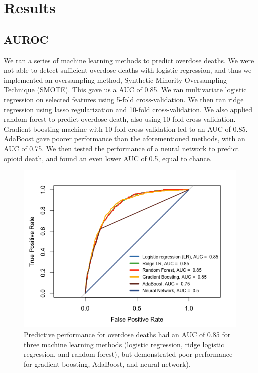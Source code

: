 \documentclass[twoside,10.5pt]{article}
\begin{document}
\section{Results}

\subsection{AUROC}
We ran a series of machine learning methods to predict overdose deaths. We were not able to detect sufficient overdose deaths with logistic regression, and thus we implemented an oversampling method, Synthetic Minority Oversampling Technique (SMOTE). This gave us a AUC of 0.85. 
We ran multivariate logistic regression on selected features using 5-fold cross-validation.
We then ran ridge regression using lasso regularization and 10-fold cross-validation.
We also applied random forest to predict overdose death, also using 10-fold cross-validation. 
Gradient boosting machine with 10-fold cross-validation led to an AUC of 0.85.
AdaBoost gave poorer performance than the aforementioned methods, with an AUC of 0.75. We then tested the performance of a neural network to predict opioid death, and found an even lower AUC of 0.5, equal to chance. 

\begin{figure}[htp]
\centering
\includegraphics[width=12cm]{images/AUC_ML_opioids.png}
\caption{Predictive performance for overdose deaths had an AUC of 0.85 for three machine learning methods (logistic regression, ridge logistic regression, and random forest), but demonstrated poor performance for gradient boosting, AdaBoost, and neural network).}
\label{fig:lion}
\end{figure}
\end{document}
